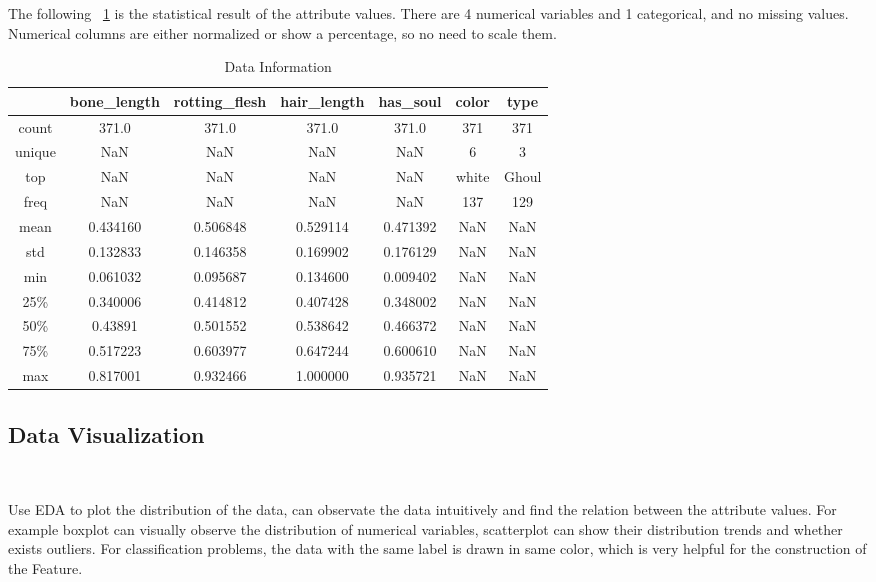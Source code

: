 The following  ~\cref{tbl:data information}
is the statistical result of the attribute values.
There are 4 numerical variables and 1 categorical,
and no missing values.
Numerical columns are either normalized or show a percentage, 
so no need to scale them. 

\begin{table}[htbp]  \centering
	\caption{Data Information}
	\label{tbl:data information}
	\begin{tabular}{ccccccc}
		\hline
		& bone\_length & rotting\_flesh & hair\_length & has\_soul & color & type\\
		\hline
		count & 371.0 & 371.0 & 371.0 & 371.0 & 371 & 371 \\
		unique & NaN & NaN & NaN & NaN & 6 & 3 \\
		top & NaN & NaN & NaN & NaN & white & Ghoul \\
		freq & NaN & NaN & NaN & NaN & 137 & 129\\
		mean & 0.434160 & 0.506848 & 0.529114 & 0.471392 & NaN & NaN \\
		std & 0.132833 & 0.146358 & 0.169902 & 0.176129 & NaN & NaN \\
		min & 0.061032 & 0.095687 & 0.134600 & 0.009402 & NaN & NaN \\
		25\% & 0.340006 & 0.414812 & 0.407428 & 0.348002 & NaN & NaN \\
		50\% & 0.43891 & 0.501552 & 0.538642 & 0.466372 & NaN & NaN\\
		75\% & 0.517223 & 0.603977 & 0.647244 & 0.600610 & NaN & NaN\\
		max &  0.817001 & 0.932466 & 1.000000 & 0.935721 & NaN & NaN\\
		\hline 
	\end{tabular}
\end{table}


\subsection{Data Visualization}
\

Use EDA to plot the distribution of the data,
can observate the data intuitively and
find the relation between the attribute values. 
For example boxplot can visually observe 
the distribution of numerical variables, 
scatterplot can show their distribution trends 
and whether exists outliers.
For classification problems, 
the data with the same label is drawn in same color, 
which is very helpful for 
the construction of the Feature.


